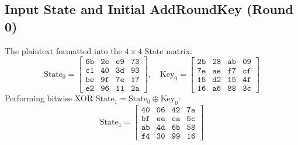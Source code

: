 \subsection{Input State and Initial AddRoundKey (Round 0)}
The plaintext formatted into the $4 \times 4$ State matrix:
\begin{equation}
\text{State}_0 = \begin{bmatrix}
\texttt{6b} & \texttt{2e} & \texttt{e9} & \texttt{73} \\
\texttt{c1} & \texttt{40} & \texttt{3d} & \texttt{93} \\
\texttt{be} & \texttt{9f} & \texttt{7e} & \texttt{17} \\
\texttt{e2} & \texttt{96} & \texttt{11} & \texttt{2a}
\end{bmatrix}, \quad
\text{Key}_0 = \begin{bmatrix}
\texttt{2b} & \texttt{28} & \texttt{ab} & \texttt{09} \\
\texttt{7e} & \texttt{ae} & \texttt{f7} & \texttt{cf} \\
\texttt{15} & \texttt{d2} & \texttt{15} & \texttt{4f} \\
\texttt{16} & \texttt{a6} & \texttt{88} & \texttt{3c}
\end{bmatrix}
\end{equation}
Performing bitwise XOR $\text{State}_1 = \text{State}_0 \oplus \text{Key}_0$:
\begin{equation}
\text{State}_1 = \begin{bmatrix}
\texttt{40} & \texttt{06} & \texttt{42} & \texttt{7a} \\
\texttt{bf} & \texttt{ee} & \texttt{ca} & \texttt{5c} \\
\texttt{ab} & \texttt{4d} & \texttt{6b} & \texttt{58} \\
\texttt{f4} & \texttt{30} & \texttt{99} & \texttt{16}
\end{bmatrix}
\end{equation}

